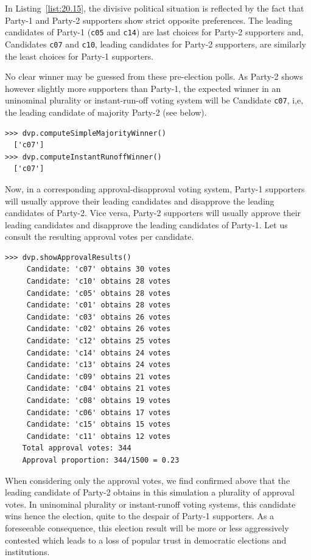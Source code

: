 In Listing~\vref{list:20.15}, the divisive political situation is reflected by the fact that Party-1 and Party-2 supporters show strict opposite preferences. The leading candidates of Party-1 (\texttt{c05} and \texttt{c14}) are last choices for Party-2 supporters and, Candidates \texttt{c07} and \texttt{c10}, leading candidates for Party-2 supporters, are similarly the least choices for Party-1 supporters.

No clear winner may be guessed from these pre-election polls. As Party-2 shows however slightly more supporters than Party-1, the expected winner in an uninominal plurality or instant-run-off voting system will be Candidate \texttt{c07}, i,e, the leading candidate of majority Party-2 (see below).
\begin{lstlisting}
>>> dvp.computeSimpleMajorityWinner()
  ['c07']
>>> dvp.computeInstantRunoffWinner()
  ['c07']
\end{lstlisting}

Now, in a corresponding approval-disapproval voting system, Party-1 supporters will usually approve their leading candidates and disapprove the leading candidates of Party-2. Vice versa, Party-2 supporters will usually approve their leading candidates and disapprove the leading candidates of Party-1. Let us consult the resulting approval votes per candidate.
\begin{lstlisting}
>>> dvp.showApprovalResults()
     Candidate: 'c07' obtains 30 votes
     Candidate: 'c10' obtains 28 votes
     Candidate: 'c05' obtains 28 votes
     Candidate: 'c01' obtains 28 votes
     Candidate: 'c03' obtains 26 votes
     Candidate: 'c02' obtains 26 votes
     Candidate: 'c12' obtains 25 votes
     Candidate: 'c14' obtains 24 votes
     Candidate: 'c13' obtains 24 votes
     Candidate: 'c09' obtains 21 votes
     Candidate: 'c04' obtains 21 votes
     Candidate: 'c08' obtains 19 votes
     Candidate: 'c06' obtains 17 votes
     Candidate: 'c15' obtains 15 votes
     Candidate: 'c11' obtains 12 votes
    Total approval votes: 344
    Approval proportion: 344/1500 = 0.23
\end{lstlisting}

When considering only the approval votes, we find confirmed above that the leading candidate of Party-2 obtains in this simulation a plurality of approval votes. In uninominal plurality or instant-runoff voting systems, this candidate wins hence the election, quite to the despair of Party-1 supporters. As a foreseeable consequence, this election result will be more or less aggressively contested which leads to a loss of popular trust in democratic elections and institutions.

